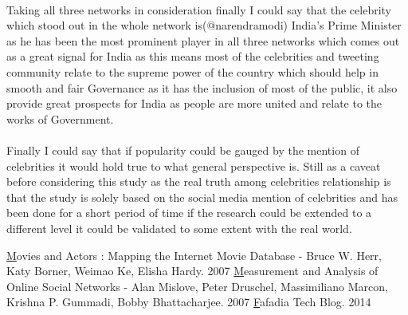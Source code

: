 \documentclass[runningheads,a4paper]{llncs}
\begin{document}
\paragraph{}
Taking all three networks in consideration finally I could say that the celebrity which stood out in the whole network is(@narendramodi) India's Prime Minister as he has been the most prominent player in all three networks which comes out as a great signal for India as this means most of the celebrities and tweeting community relate to the supreme power of the country which should help in smooth and fair Governance as it has the inclusion of most of the public, it also provide great prospects for India as people are more united and relate to the works of Government.

\paragraph{}
Finally I could say that if popularity could be gauged by the mention of celebrities it would hold true to what general perspective is. Still as a caveat before considering this study as the real truth among celebrities relationship is that the study is solely based on the social media mention of celebrities and has been done for a short period of time if the research could be extended to a different level it could be validated to some extent with the real world.

\begin{thebibliography}{3}

 \href{http://nwb.cns.iu.edu/papers/2007-herr-movieact.pdf}Movies and Actors : Mapping the Internet Movie Database - Bruce W. Herr, Katy Borner, Weimao Ke, Elisha Hardy. 2007
\vspace{0.1in}
 \href{http://www.mpi-sws.org/~mmarcon/SocialNetworks-IMC.pdf}Measurement and Analysis of Online Social Networks - Alan Mislove, Peter Druschel, Massimiliano Marcon, Krishna P. Gummadi, Bobby Bhattacharjee. 2007
\vspace{0.1in}
 \href{https://github.com/sidharthshah/bollywood-social-network-analysis}Fafadia Tech Blog. 2014

\end{thebibliography}
\end{document}

